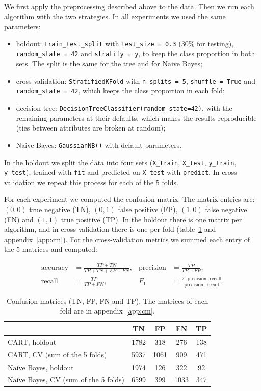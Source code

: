 \documentclass[12pt,a4paper]{article}
\newcommand{\code}[1]{\texttt{#1}}
\begin{document}
We first apply the preprocessing described above to the data. Then we run each algorithm with the two strategies. In all experiments we used the same parameters:

\begin{itemize}[noitemsep]
  \item holdout: \code{train\_test\_split} with \code{test\_size = 0.3} (30\% for testing), \code{random\_state = 42} and \code{stratify = y}, to keep the class proportion in both sets. The split is the same for the tree and for Naive Bayes;
  \item cross-validation: \code{StratifiedKFold} with \code{n\_splits = 5}, \code{shuffle = True} and \code{random\_state = 42}, which keeps the class proportion in each fold;
  \item decision tree: \code{DecisionTreeClassifier(random\_state=42)}, with the remaining parameters at their defaults, which makes the results reproducible (ties between attributes are broken at random);
  \item Naive Bayes: \code{GaussianNB()} with default parameters.
\end{itemize}

In the holdout we split the data into four sets (\code{X\_train}, \code{X\_test}, \code{y\_train}, \code{y\_test}), trained with \code{fit} and predicted on \code{X\_test} with \code{predict}. In cross-validation we repeat this process for each of the 5 folds.

For each experiment we computed the confusion matrix. The matrix entries are: $(0,0)$ true negative (TN), $(0,1)$ false positive (FP), $(1,0)$ false negative (FN) and $(1,1)$ true positive (TP). In the holdout there is one matrix per algorithm, and in cross-validation there is one per fold (table~\ref{tab:cm} and appendix~\ref{app:cm}). For the cross-validation metrics we summed each entry of the 5 matrices and computed:

\begin{align*}
  \text{accuracy} &= \frac{TP+TN}{TP+TN+FP+FN}, & \text{precision} &= \frac{TP}{TP+FP},\\
  \text{recall} &= \frac{TP}{TP+FN}, & F_1 &= \frac{2\cdot\text{precision}\cdot\text{recall}}{\text{precision}+\text{recall}}.
\end{align*}

\begin{table}[H]
  \centering
  \small
  \begin{tabular}{lcccc}
    \toprule
     & TN & FP & FN & TP \\
    \midrule
    CART, holdout   & 1782 & 318 & 276 & 138 \\
    CART, CV (sum of the 5 folds)  & 5937 & 1061 & 909 & 471 \\
    Naive Bayes, holdout  & 1974 & 126 & 322 & 92 \\
    Naive Bayes, CV (sum of the 5 folds)  & 6599 & 399 & 1033 & 347 \\
    \bottomrule
  \end{tabular}
  \caption{Confusion matrices (TN, FP, FN and TP). The matrices of each fold are in appendix~\ref{app:cm}.}
  \label{tab:cm}
\end{table}
\end{document}
